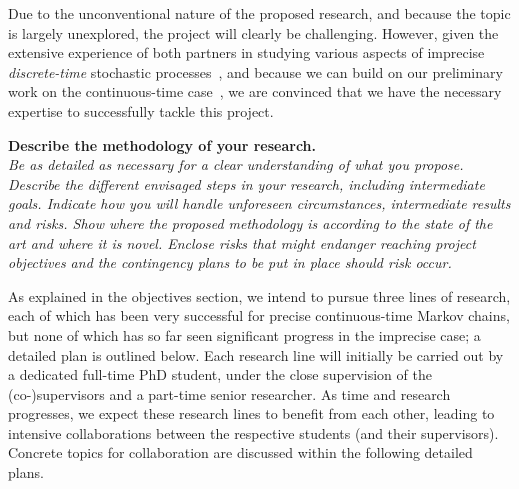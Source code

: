 \documentclass[11pt,dvipsnames,usenames,a4paper]{article}
\begin{document}
Due to the unconventional nature of the proposed research, and because the topic is largely unexplored, the project will clearly be challenging. 
However, given the extensive experience of both partners in studying various aspects of imprecise \emph{discrete-time} stochastic processes~\cite{cooman2007d,cooman2008,hermans2012,cooman2015:markovergodic,debock2014:estihmm}, and because we can build on our preliminary work on the continuous-time case~\cite{DeBock:2016:iCTMClimit,erreygers2017:ictmcs,rottondi2017:flexigrid,skulj2015}, we are convinced that we have the necessary expertise to successfully tackle this project.


\vspace{7pt}

\textbf{Describe the methodology of your research.}\\
\textit{Be as detailed as necessary for a clear understanding of what you propose.
Describe the different envisaged steps in your research, including intermediate goals. Indicate how you will handle unforeseen circumstances, intermediate results and risks.
Show where the proposed methodology is according to the state of the art and where it is novel.
Enclose risks that might endanger reaching project objectives and the contingency plans to be put in place should risk occur.}

As explained in the objectives section, we intend to pursue three lines of research, each of which has been very successful for precise continuous-time Markov chains, but none of which has so far seen significant progress in the imprecise case; a detailed plan is outlined below. 
Each research line will initially be carried out by a dedicated full-time PhD student, under the close supervision of the (co-)supervisors and a part-time senior researcher. 
As time and research progresses, we expect these research lines to benefit from each other, leading to intensive collaborations between the respective students (and their supervisors). Concrete topics for collaboration are discussed within the following detailed plans.
\end{document}
